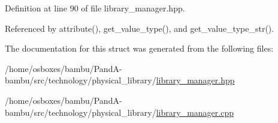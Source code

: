 Definition at line 90 of file library\+\_\+manager.\+hpp.



Referenced by attribute(), get\+\_\+value\+\_\+type(), and get\+\_\+value\+\_\+type\+\_\+str().



The documentation for this struct was generated from the following files\+:\begin{DoxyCompactItemize}
\item 
/home/osboxes/bambu/\+Pand\+A-\/bambu/src/technology/physical\+\_\+library/\hyperlink{library__manager_8hpp}{library\+\_\+manager.\+hpp}\item 
/home/osboxes/bambu/\+Pand\+A-\/bambu/src/technology/physical\+\_\+library/\hyperlink{library__manager_8cpp}{library\+\_\+manager.\+cpp}\end{DoxyCompactItemize}
